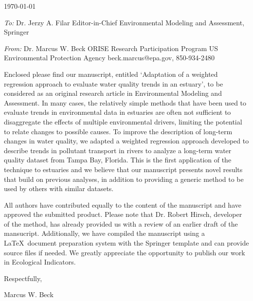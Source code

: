 \documentclass[a4paper,12pt]{article}
\begin{document}
\renewcommand{\rmdefault}{ptm}
\pagestyle{empty} 

\setlength{\parindent}{0mm} 
\setlength{\parskip}{5mm}

\begin{flushright}
\today
\end{flushright}

\emph{To:}\newline
Dr. Jerzy A. Filar\newline
Editor-in-Chief\newline
Environmental Modeling and Assessment, Springer

\emph{From:}\newline
Dr. Marcus W. Beck\newline
ORISE Research Participation Program\newline
US Environmental Protection Agency\newline
beck.marcus@epa.gov, 850-934-2480\vspace{14.5pt}

Enclosed please find our manuscript, entitled `Adaptation of a weighted regression approach to evaluate water quality trends in an estuary', to be considered as an original research article in Environmental Modeling and Assessment.  In many cases, the relatively simple methods that have been used to evaluate trends in environmental data in estuaries are often not sufficient to disaggregate the effects of multiple environmental drivers, limiting the potential to relate changes to possible causes.  To improve the description of long-term changes in water quality, we adapted a weighted regression approach developed to describe trends in pollutant transport in rivers to analyze a long-term water quality dataset from Tampa Bay, Florida. This is the first application of the technique to estuaries and we believe that our manuscript presents novel results that build on previous analyses, in addition to providing a generic method to be used  by others with similar datasets.

All authors have contributed equally to the content of the manuscript and have approved the submitted product.  Please note that Dr. Robert Hirsch, developer of the method, has already provided us with a review of an earlier draft of the mansucript.  Additionally, we have compiled the manuscript using a \LaTeX\ document preparation system with the Springer template and can provide source files if needed.  We greatly appreciate the opportunity to publish our work in Ecological Indicators.\vspace{0.5in}

\hspace{4.5in}Respectfully,

\hspace{4.5in}Marcus W. Beck
\end{document}
